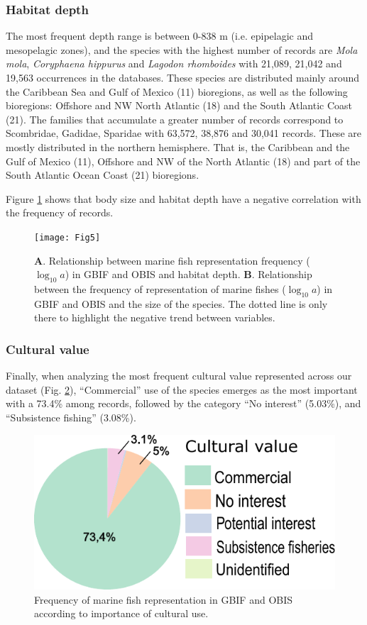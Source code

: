 \documentclass[12pt,authoryear]{elsarticle}
\begin{document}
\subsubsection{Habitat depth}
The most frequent depth range is between 0-838 m (i.e. epipelagic and mesopelagic zones), and the species with the highest number of records are \textit{Mola mola}, \textit{Coryphaena hippurus} and \textit{Lagodon rhomboides} with 21,089, 21,042 and 19,563 occurrences in the databases. These species are distributed mainly around the Caribbean Sea and Gulf of Mexico (11) bioregions, as well as the following bioregions: Offshore and NW North Atlantic (18) and the South Atlantic Coast (21). The families that accumulate a greater number of records correspond to Scombridae, Gadidae, Sparidae with 63,572, 38,876 and 30,041 records. These are mostly distributed in the northern hemisphere. That is, the Caribbean and the Gulf of Mexico (11), Offshore and NW of the North Atlantic (18) and part of the South Atlantic Ocean Coast (21) bioregions.

Figure \ref{fig:A_depth_size} shows that body size and habitat depth have a negative correlation with the frequency of records. 

\begin{figure}[h]
  \centering
  \texttt{[image: Fig5]}
  \caption{\textbf{A}. Relationship between marine fish representation frequency ($\log_{10} a$) in GBIF and OBIS and habitat depth. \textbf{B}. Relationship between the frequency of representation of marine fishes ($\log_{10} a$) in GBIF and OBIS and the size of the species. The dotted line is only there to highlight the negative trend between variables.}
  \label{fig:A_depth_size}
\end{figure}

\subsubsection{Cultural value}
Finally, when analyzing the most frequent cultural value represented across our dataset (Fig. \ref{fig:A_importance}), ``Commercial'' use of the species emerges as the most important with a 73.4\% among records, followed by the category ``No interest'' (5.03\%), and ``Subsistence fishing'' (3.08\%). 


\begin{figure}[h]
  \centering
  \includegraphics[width=.65\textwidth]{Fig6}
  \caption{Frequency of marine fish representation in GBIF and OBIS according to importance of cultural use.}
  \label{fig:A_importance}
\end{figure}
\end{document}

